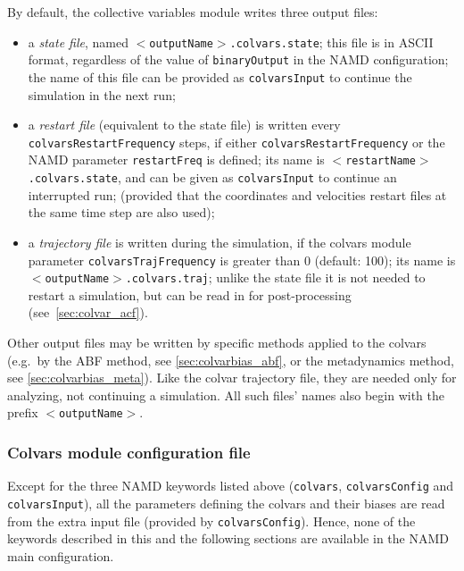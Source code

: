By default, the collective variables module writes three output
files:
\begin{itemize}

\item a \emph{state file}, named
  \texttt{$<$outputName$>$.colvars.state}; this file is in ASCII
  format, regardless of the value of \texttt{binaryOutput} in the NAMD
  configuration; the name of this file can be provided as
  \texttt{colvarsInput} to continue the simulation in the next run;

\item a \emph{restart file} (equivalent to the state file) is written
  every \texttt{colvarsRestartFrequency} steps, if either
  \texttt{colvarsRestartFrequency} or the NAMD parameter
  \texttt{restartFreq} is defined; its name is
  \texttt{$<$restartName$>$.colvars.state}, and can be given as
  \texttt{colvarsInput} to continue an interrupted run; (provided that
  the coordinates and velocities restart files at the same time step
  are also used);

\item a \emph{trajectory file} is written during the simulation, if
  the colvars module parameter \texttt{colvarsTrajFrequency} is
  greater than 0 (default: 100); its name is
  \texttt{$<$outputName$>$.colvars.traj}; unlike the state file it is
  not needed to restart a simulation, but can be read in for
  post-processing (see~\ref{sec:colvar_acf}).

\end{itemize}

Other output files may be written by specific methods applied to the
colvars (e.g.~by the ABF method, see \ref{sec:colvarbias_abf}, or the
metadynamics method, see \ref{sec:colvarbias_meta}).  Like the colvar
trajectory file, they are needed only for analyzing, not continuing a
simulation.  All such files' names also begin with the prefix
\texttt{$<$outputName$>$}.


\subsubsection{Colvars module configuration file}

Except for the three NAMD keywords listed above (\texttt{colvars},
\texttt{colvarsConfig} and \texttt{colvarsInput}), all the parameters
defining the colvars and their biases are read from the extra input
file (provided by \texttt{colvarsConfig}).  Hence, none of the
keywords described in this and the following sections are available in
the NAMD main configuration.

